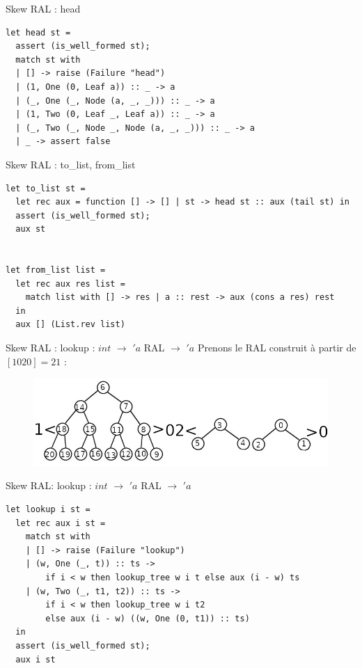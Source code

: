 \documentclass{beamer}
\begin{document}
\begin{frame}[fragile]{Skew RAL : head}
\begin{lstlisting}
let head st =
  assert (is_well_formed st);
  match st with
  | [] -> raise (Failure "head")
  | (1, One (0, Leaf a)) :: _ -> a
  | (_, One (_, Node (a, _, _))) :: _ -> a
  | (1, Two (0, Leaf _, Leaf a)) :: _ -> a
  | (_, Two (_, Node _, Node (a, _, _))) :: _ -> a
  | _ -> assert false
\end{lstlisting}
    
\end{frame}

\begin{frame}[fragile]{Skew RAL : to\_list, from\_list}
\begin{lstlisting}
let to_list st =
  let rec aux = function [] -> [] | st -> head st :: aux (tail st) in
  assert (is_well_formed st);
  aux st


let from_list list =
  let rec aux res list =
    match list with [] -> res | a :: rest -> aux (cons a res) rest
  in
  aux [] (List.rev list)
\end{lstlisting}
\end{frame}

\begin{frame}{Skew RAL : lookup : $int$ $\rightarrow$ $'a$ RAL $\rightarrow$ $'a$}
Prenons le RAL construit à partir de $[1020] = 21$ :
\begin{figure}
    \centering
   \includegraphics[width=\textwidth]{exemple_ral_entier.png}
\end{figure}
    
\end{frame}

\begin{frame}[fragile]{Skew RAL: lookup : $int$ $\rightarrow$ $'a$ RAL $\rightarrow$ $'a$}
\begin{lstlisting}
let lookup i st =
  let rec aux i st =
    match st with
    | [] -> raise (Failure "lookup")
    | (w, One (_, t)) :: ts ->
        if i < w then lookup_tree w i t else aux (i - w) ts
    | (w, Two (_, t1, t2)) :: ts ->
        if i < w then lookup_tree w i t2
        else aux (i - w) ((w, One (0, t1)) :: ts)
  in
  assert (is_well_formed st);
  aux i st
\end{lstlisting}
    
\end{frame}
\end{document}
